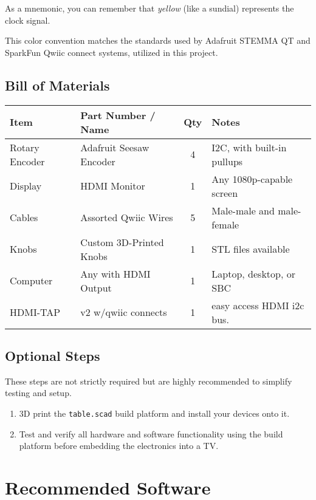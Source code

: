 \documentclass[]{article}
\begin{document}
As a mnemonic, you can remember that \textit{yellow} (like a sundial) represents the clock signal.

This color convention matches the standards used by Adafruit STEMMA QT and SparkFun Qwiic connect systems, utilized in this project.

\subsection*{Bill of Materials}

\begin{center}
	\begin{tabular}{|l|l|c|l|}
		\hline
		\textbf{Item} & \textbf{Part Number / Name} & \textbf{Qty} & \textbf{Notes} \\
		\hline
		Rotary Encoder & Adafruit Seesaw Encoder  & 4 & I2C, with built-in pullups \\
		Display         & HDMI Monitor             & 1 & Any 1080p-capable screen \\
		Cables          & Assorted Qwiic Wires      & 5 & Male-male and male-female \\
		Knobs           & Custom 3D-Printed Knobs   & 1 & STL files available \\
		Computer        & Any with HDMI Output       & 1 & Laptop, desktop, or SBC \\
		HDMI-TAP        & v2 w/qwiic connects		&1&  easy access HDMI i2c bus.\\
		
		\hline
	\end{tabular}
\end{center}

\subsection*{Optional Steps}

These steps are not strictly required but are highly recommended to simplify testing and setup.

\begin{enumerate}
	\item 3D print the \texttt{table.scad} build platform and install your devices onto it.
	\item Test and verify all hardware and software functionality using the build platform before embedding the electronics into a TV.
\end{enumerate}

\section*{Recommended Software}
\end{document}
